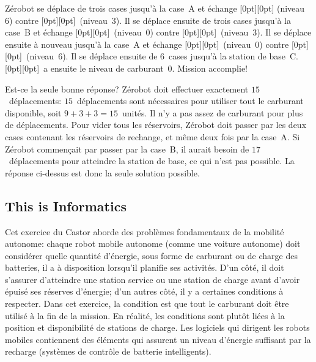 \documentclass[a4paper,11pt]{report}
\newcommand{\taskGraphicsFolder}{..}
\begin{document}
Zérobot se déplace de trois cases jusqu’à la case~A et échange \raisebox{-0.5ex}[0pt][0pt]{} (niveau~$6$) contre \raisebox{-0.5ex}[0pt][0pt]{}~(niveau~$3$). Il se déplace ensuite de trois cases jusqu’à la case~B et échange \raisebox{-0.5ex}[0pt][0pt]{}~(niveau~$0$) contre \raisebox{-0.5ex}[0pt][0pt]{}~(niveau~$3$). Il se déplace ensuite à nouveau jusqu’à la case~A et échange \raisebox{-0.5ex}[0pt][0pt]{}~(niveau~$0$) contre \raisebox{-0.5ex}[0pt][0pt]{}~(niveau~$6$). Il se déplace ensuite de $6$~cases jusqu’à la station de base~C. \raisebox{-0.5ex}[0pt][0pt]{}~a ensuite le niveau de carburant~$0$. Mission accomplie!

Est-ce la seule bonne réponse? Zérobot doit effectuer exactement $15$~déplacements: $15$~déplacements sont nécessaires pour utiliser tout le carburant disponible, soit ${9 + 3 + 3 = 15}$~unités. Il n’y a pas assez de carburant pour plus de déplacements. Pour vider tous les réservoirs, Zérobot doit passer par les deux cases contenant les réservoirs de rechange, et même deux fois par la case~A. Si Zérobot commençait par passer par la case~B, il aurait besoin de $17$~déplacements pour atteindre la station de base, ce qui n’est pas possible. La réponse ci-dessus est donc la seule solution possible.


\subsection*{This is Informatics}

Cet exercice du Castor aborde des problèmes fondamentaux de la mobilité autonome: chaque robot mobile autonome (comme une voiture autonome) doit considérer quelle quantité d’énergie, sous forme de carburant ou de charge des batteries, il a à disposition lorsqu’il planifie ses activités. D’un côté, il doit s’assurer d’atteindre une station service ou une station de charge avant d’avoir épuisé ses réserves d’énergie; d’un autres côté, il y a certaines conditions à respecter. Dans cet exercice, la condition est que tout le carburant doit être utilisé à la fin de la mission. En réalité, les conditions sont plutôt liées à la position et disponibilité de stations de charge. Les logiciels qui dirigent les robots mobiles contiennent des éléments qui assurent un niveau d’énergie suffisant par la recharge (systèmes de contrôle de batterie intelligents).
\end{document}
